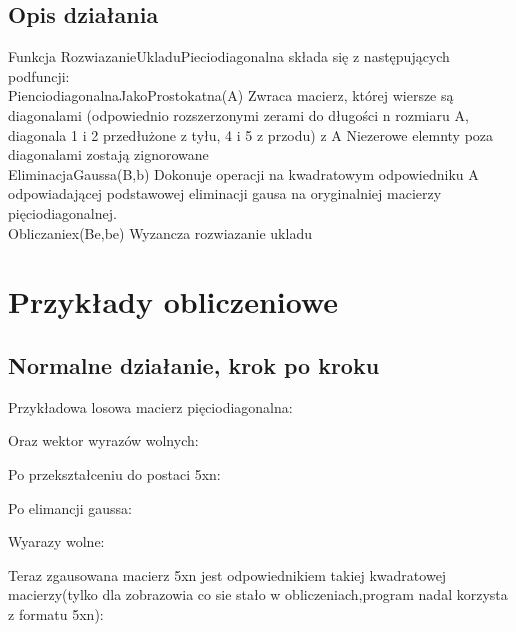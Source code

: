 \documentclass[11pt]{article}
\begin{document}
  \subsection*{Opis działania}
    Funkcja RozwiazanieUkladuPieciodiagonalna składa się z następujących podfuncji:\\
    \indent PienciodiagonalnaJakoProstokatna(A) Zwraca macierz, której wiersze są           diagonalami 
    (odpowiednio rozszerzonymi zerami do długości n rozmiaru A, 
    diagonala 1 i 2 przedłużone z tyłu, 4 i 5 z przodu) z A
    Niezerowe elemnty poza diagonalami zostają zignorowane \\
    \indent EliminacjaGaussa(B,b) Dokonuje operacji na kwadratowym odpowiedniku A           odpowiadającej podstawowej eliminacji gausa
    na oryginalniej macierzy pięciodiagonalnej. \\
    \indent Obliczaniex(Be,be) Wyzancza rozwiazanie ukladu  

\newpage
\section*{Przykłady obliczeniowe}

\subsection*{Normalne działanie, krok po kroku}
Przykładowa losowa macierz pięciodiagonalna:
\begin{center}
\end{center}

Oraz wektor wyrazów wolnych:
\begin{center}
\end{center}

Po przekształceniu do postaci 5xn:
\begin{center}
\end{center}

Po elimancji gaussa:
\begin{center}
\end{center}

Wyarazy wolne:
\begin{center}
\end{center}

Teraz zgausowana macierz 5xn jest odpowiednikiem takiej kwadratowej macierzy(tylko dla zobrazowia co sie stało w obliczeniach,program nadal korzysta z formatu 5xn):
\begin{center}
\end{center}
\end{document}
